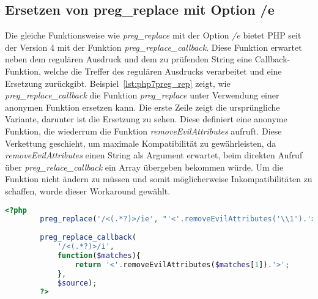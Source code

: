     \subsection{Ersetzen von preg\_replace mit Option /e}
    Die gleiche Funktionsweise wie \textit{preg\_replace} mit der Option \textit{/e} bietet \ac{PHP} seit der Version 4 mit der 
    Funktion \textit{preg\_replace\_callback}. Diese Funktion erwartet neben dem regulären Ausdruck und dem zu prüfenden 
    String eine Callback-Funktion, welche die Treffer des regulären Ausdrucks verarbeitet und eine Ersetzung zurückgibt.
    Beispiel~\ref{lst:php7preg_rep} zeigt, wie \textit{preg\_replace\_callback} die Funktion \textit{preg\_replace} unter 
    Verwendung einer anonymen Funktion ersetzen kann. Die erste Zeile zeigt die ursprüngliche Variante, darunter ist die 
    Ersetzung zu sehen. Diese definiert eine anonyme Funktion, die wiederrum die Funktion \textit{removeEvilAttributes} aufruft. 
    Diese Verkettung geschieht, um maximale Kompatibilität zu gewährleisten, da \textit{removeEvilAttributes} einen String 
    als Argument erwartet, beim direkten Aufruf über \textit{preg\_relace\_callback} ein Array übergeben bekommen würde. Um 
    die Funktion nicht ändern zu müssen und somit möglicherweise Inkompatibilitäten zu schaffen, wurde dieser Workaround 
    gewählt.

    \begin{lstlisting}[language=php, caption={Beispiel der Nutzung von preg\_replace\_callback}, label={lst:php7preg_rep}]
        <?php
        preg_replace('/<(.*?)>/ie', "'<'.removeEvilAttributes('\\1').'>'", $source);
        
        preg_replace_callback(
            '/<(.*?)>/i', 
            function($matches){
                return '<'.removeEvilAttributes($matches[1]).'>';
            },
            $source);
        ?>
    \end{lstlisting}
